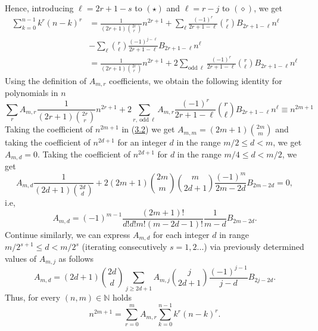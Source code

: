\documentclass[12pt, letterpaper]{amsart}
\theoremstyle{definition}
\theoremstyle{remark}
\numberwithin{equation}{section}
\begin{document}
Hence, introducing $\ell=2r+1-s$ to $(\star)$ and $\ell=r-j$ to $(\diamond)$, we get
\begin{equation*}
\begin{split}
\sum_{k=0}^{n-1}k^r(n-k)^r
&=\frac{1}{(2r+1)\binom{2r}r}n^{2r+1}+\sum_{\ell}\frac{(-1)^r}{2r+1-\ell}\binom{r}{\ell}B_{2r+1-\ell}n^{\ell}\\
&-\sum_{\ell} \binom{r}{\ell}\frac{(-1)^{j-\ell}}{2r+1-\ell}B_{2r+1-\ell}n^{\ell}\\
&=\frac{1}{(2r+1)\binom{2r}r}n^{2r+1}+2\sum_{\mathrm{odd} \ \ell}\frac{(-1)^r}{2r+1-\ell}\binom{r}{\ell}B_{2r+1-\ell}n^{\ell}
\end{split}
\end{equation*}
Using the definition of $A_{m,r}$ coefficients, we obtain the following identity for polynomials in $n$
\begin{equation}\label{proof2}
\sum_{r}A_{m,r}\frac{1}{(2r+1)\binom{2r}r}n^{2r+1}+2\sum_{r, \ \mathrm{odd} \ \ell}A_{m,r}\frac{(-1)^r}{2r+1-\ell}\binom{r}{\ell}B_{2r+1-\ell}n^{\ell}\equiv n^{2m+1}
\end{equation}
Taking the coefficient of $n^{2m+1}$ in (\hyperref[proof2]{3.2}) we get $A_{m,m}=(2m+1)\binom{2m}m$ and taking the coefficient of $n^{2d+1}$ for an integer $d$ in the range $m/2 \leq d < m$, we get $A_{m,d}=0$. Taking the coefficient of $n^{2d+1}$ for $d$ in the range $m/4 \leq d < m/2$, we get
\begin{equation*}
A_{m,d} \frac{1}{(2d+1)\binom{2d}{d}} + 2 (2m+1) \binom{2m}{m} \binom{m}{2d+1} \frac{(-1)^m}{2m-2d} B_{2m-2d} = 0,
\end{equation*}
i.e,
\begin{equation*}
A_{m,d} = (-1)^{m-1} \frac{(2m+1)!}{d!d!m!(m-2d-1)!}\frac{1}{m-d} B_{2m-2d}.
\end{equation*}
Continue similarly, we can express $A_{m,d}$ for each integer $d$ in range $m/2^{s+1}\leq d< m/2^s$ (iterating consecutively $s=1,2...$) via previously determined values of $A_{m,j}$ as follows
\begin{equation*}
A_{m,d} = (2d+1)\binom{2d}{d} \sum_{j\geq 2d+1} A_{m,j} \binom{j}{2d+1} \frac{(-1)^{j-1}}{j-d} B_{2j-2d}.
\end{equation*}
Thus, for every $(n,m)\in\mathbb{N}$ holds
\begin{equation*}
n^{2m+1}=\sum_{r=0}^{m}A_{m,r}\sum_{k=0}^{n-1}k^r(n-k)^r.
\end{equation*}
\end{document}
